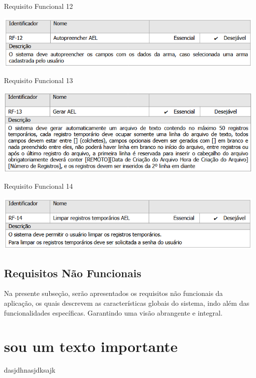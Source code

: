 \begin{table}[h]
    \caption{Requisito Funcional 12}
    \centering
    \includegraphics[scale=0.9]{imagens/rf12.png}
    \label{tab:rf12}
\end{table}

\begin{table}[h]
    \caption{Requisito Funcional 13}
    \centering
    \includegraphics[scale=0.9]{imagens/rf13.png}
    \label{tab:rf13}
\end{table}

\begin{table}[h]
    \caption{Requisito Funcional 14}
    \centering
    \includegraphics[scale=0.9]{imagens/rf14.png}
    \label{tab:rf14}
\end{table}

\subsection{Requisitos Não Funcionais}
Na presente subseção, serão apresentados os requisitos não funcionais da aplicação, os quais descrevem as características globais do sistema, indo além das funcionalidades específicas.
Garantindo uma visão abrangente e integral.

\section*{sou um texto importante}
dasjdhnasjdksajk

